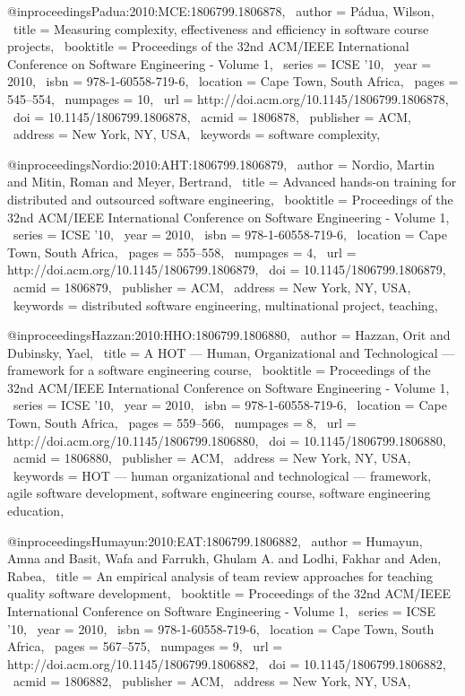 @inproceedings{Padua:2010:MCE:1806799.1806878,
 author = {P\'{a}dua, Wilson},
 title = {Measuring complexity, effectiveness and efficiency in software course projects},
 booktitle = {Proceedings of the 32nd ACM/IEEE International Conference on Software Engineering - Volume 1},
 series = {ICSE '10},
 year = {2010},
 isbn = {978-1-60558-719-6},
 location = {Cape Town, South Africa},
 pages = {545--554},
 numpages = {10},
 url = {http://doi.acm.org/10.1145/1806799.1806878},
 doi = {10.1145/1806799.1806878},
 acmid = {1806878},
 publisher = {ACM},
 address = {New York, NY, USA},
 keywords = {software complexity},
} 

@inproceedings{Nordio:2010:AHT:1806799.1806879,
 author = {Nordio, Martin and Mitin, Roman and Meyer, Bertrand},
 title = {Advanced hands-on training for distributed and outsourced software engineering},
 booktitle = {Proceedings of the 32nd ACM/IEEE International Conference on Software Engineering - Volume 1},
 series = {ICSE '10},
 year = {2010},
 isbn = {978-1-60558-719-6},
 location = {Cape Town, South Africa},
 pages = {555--558},
 numpages = {4},
 url = {http://doi.acm.org/10.1145/1806799.1806879},
 doi = {10.1145/1806799.1806879},
 acmid = {1806879},
 publisher = {ACM},
 address = {New York, NY, USA},
 keywords = {distributed software engineering, multinational project, teaching},
} 

@inproceedings{Hazzan:2010:HHO:1806799.1806880,
 author = {Hazzan, Orit and Dubinsky, Yael},
 title = {A HOT --- Human, Organizational and Technological --- framework for a software engineering course},
 booktitle = {Proceedings of the 32nd ACM/IEEE International Conference on Software Engineering - Volume 1},
 series = {ICSE '10},
 year = {2010},
 isbn = {978-1-60558-719-6},
 location = {Cape Town, South Africa},
 pages = {559--566},
 numpages = {8},
 url = {http://doi.acm.org/10.1145/1806799.1806880},
 doi = {10.1145/1806799.1806880},
 acmid = {1806880},
 publisher = {ACM},
 address = {New York, NY, USA},
 keywords = {HOT --- human organizational and technological --- framework, agile software development, software engineering course, software engineering education},
} 

@inproceedings{Humayun:2010:EAT:1806799.1806882,
 author = {Humayun, Amna and Basit, Wafa and Farrukh, Ghulam A. and Lodhi, Fakhar and Aden, Rabea},
 title = {An empirical analysis of team review approaches for teaching quality software development},
 booktitle = {Proceedings of the 32nd ACM/IEEE International Conference on Software Engineering - Volume 1},
 series = {ICSE '10},
 year = {2010},
 isbn = {978-1-60558-719-6},
 location = {Cape Town, South Africa},
 pages = {567--575},
 numpages = {9},
 url = {http://doi.acm.org/10.1145/1806799.1806882},
 doi = {10.1145/1806799.1806882},
 acmid = {1806882},
 publisher = {ACM},
 address = {New York, NY, USA},
} 

